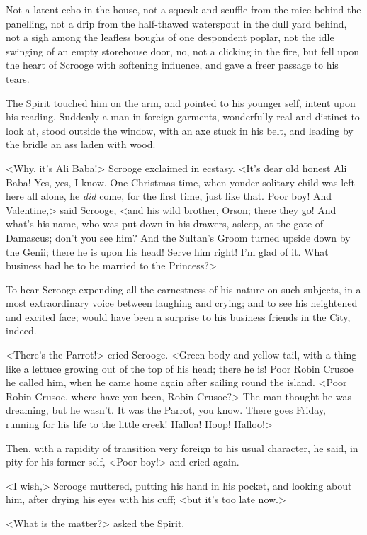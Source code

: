 Not a latent echo in the house, not a squeak and scuffle from the mice behind the panelling, not a drip from the half-thawed waterspout in the dull yard behind, not a sigh among the leafless boughs of one despondent poplar, not the idle swinging of an empty storehouse door, no, not a clicking in the fire, but fell upon the heart of Scrooge with softening influence, and gave a freer passage to his tears.

The Spirit touched him on the arm, and pointed to his younger self, intent upon his reading. Suddenly a man in foreign garments, wonderfully real and distinct to look at, stood outside the window, with an axe stuck in his belt, and leading by the bridle an ass laden with wood.

<Why, it's Ali Baba!> Scrooge exclaimed in ecstasy. <It's dear old honest Ali Baba! Yes, yes, I know. One Christmas-time, when yonder solitary child was left here all alone, he \textit{did} come, for the first time, just like that. Poor boy! And Valentine,> said Scrooge, <and his wild brother, Orson; there they go! And what's his name, who was put down in his drawers, asleep, at the gate of Damascus; don't you see him? And the Sultan's Groom turned upside down by the Genii; there he is upon his head! Serve him right! I'm glad of it. What business had he to be married to the Princess?>

To hear Scrooge expending all the earnestness of his nature on such subjects, in a most extraordinary voice between laughing and crying; and to see his heightened and excited face; would have been a surprise to his business friends in the City, indeed.

<There's the Parrot!> cried Scrooge. <Green body and yellow tail, with a thing like a lettuce growing out of the top of his head; there he is! Poor Robin Crusoe he called him, when he came home again after sailing round the island. <Poor Robin Crusoe, where have you been, Robin Crusoe?> The man thought he was dreaming, but he wasn't. It was the Parrot, you know. There goes Friday, running for his life to the little creek! Halloa! Hoop! Halloo!>

Then, with a rapidity of transition very foreign to his usual character, he said, in pity for his former self, <Poor boy!> and cried again.

<I wish,> Scrooge muttered, putting his hand in his pocket, and looking about him, after drying his eyes with his cuff; <but it's too late now.>

<What is the matter?> asked the Spirit.

